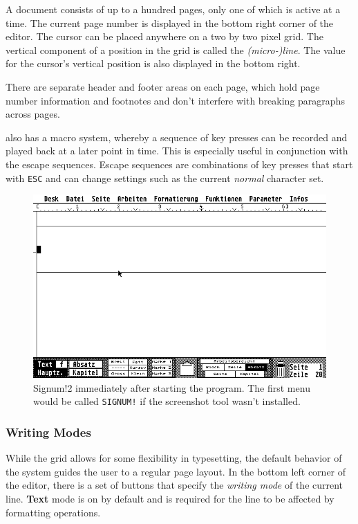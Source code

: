 A document consists of up to a hundred pages, only one of which is active at a time. The current page number is displayed in the bottom right corner of the editor. The cursor can be placed anywhere on a two by two pixel grid. The vertical component of a position in the grid is called the \textit{(micro-)line}. The value for the cursor's vertical position is also displayed in the bottom right.

There are separate header and footer areas on each page, which hold page number information and footnotes and don't interfere with breaking paragraphs across pages.


\Signum{} also has a macro system, whereby a sequence of key presses can be recorded and played back at a later point in time. This is especially useful in conjunction with the escape sequences. Escape sequences are combinations of key presses that start with \texttt{ESC} and can change settings such as the current \textit{normal} character set.

\begin{figure}
    \includegraphics[width=\columnwidth]{img/SNAP3.png}
    \caption{Signum!2 immediately after starting the program. The first menu would be called \texttt{SIGNUM!} if the screenshot tool wasn't installed.}
    \label{fig:sig2_start}
\end{figure}

\subsubsection{Writing Modes}
While the grid allows for some flexibility in typesetting, the default behavior of the system guides the user to a regular page layout. In the bottom left corner of the editor, there is a set of buttons that specify the \textit{writing mode} of the current line. \textbf{Text} mode is on by default and is required for the line to be affected by formatting operations.

